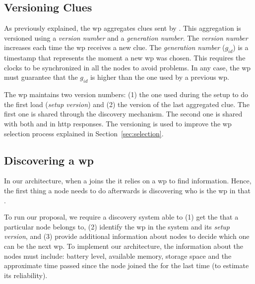 \subsection{Versioning Clues}
As previously explained, the \ac{wp} aggregates clues sent by \providers{}.
This aggregation is versioned using a \emph{version number} and a \emph{generation number}.
The \emph{version number} increases each time the \ac{wp} receives a new clue.
The \emph{generation number} ($g_{id}$) is a timestamp that represents the moment a new \ac{wp} was chosen.
This requires the clocks to be synchronized in all the nodes to avoid problems.
In any case, the \ac{wp} must guarantee that the $g_{id}$ is higher than the one used by a previous \ac{wp}.

The \ac{wp} maintains two version numbers:
(1) the one used during the setup to do the first load (\emph{setup version}) and
(2) the version of the last aggregated clue.
The first one is shared through the discovery mechanism.
The second one is shared with both \providers{} and \consumers{} in \acs{http} responses.
The versioning is used to improve the \ac{wp} selection process explained in Section~\ref{sec:selection}.


\subsection{Discovering a \acl{wp}}
In our architecture, when a \consumer{} joins the \Space{} it relies on a \ac{wp} to find information.
Hence, the first thing a node needs to do afterwards is discovering who is the \ac{wp} in that \Space{}.

To run our proposal, we require a discovery system able to
(1) get the \Spaces{} that a particular node belongs to,
(2) identify the \ac{wp} in the system and its \emph{setup version}, and
(3) provide additional information about nodes to decide which one can be the next \ac{wp}.
To implement our architecture, the information about the nodes must include:
battery level, available memory, storage space and the approximate time passed since the node joined the \Space{} for the last time (to estimate its reliability).

